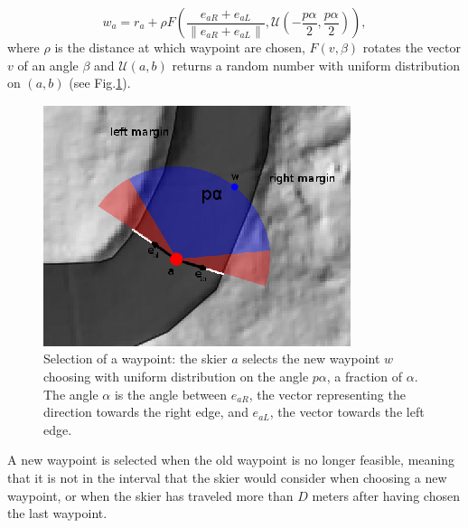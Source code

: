 \documentclass[12pt,a4paper,twoside]{book}
\newcommand{\norm}[1]{\lVert#1\rVert}
\begin{document}
\begin{equation}\label{new_waypoint}
w_a=r_a+\rho F\left(\frac{e_{aR}+e_{aL}}{\norm{e_{aR}+e_{aL}}},\mathcal{U}\left(-\frac{p \alpha}{2},\frac{p \alpha}{2}\right)\right),
\end{equation}
where $\rho$ is the distance at which waypoint are chosen, $F\left(v,\beta\right)$ rotates the vector $v$ of an angle $\beta$ and $\mathcal{U}(a,b)$ returns a random number with uniform distribution on $(a,b)$ (see Fig.\ref{new_waypoint_pic}).

\begin{figure}
  \begin{center}
    \includegraphics[width=\textwidth]{images/waypoint_new.eps}
    \caption{Selection of a waypoint: the skier $a$ selects the new waypoint $w$ choosing with uniform distribution on the angle $p\alpha$, a fraction of $\alpha$. The angle $\alpha$ is the angle between $e_{aR}$, the vector representing the direction towards the right edge, and $e_{aL}$, the vector towards the left edge.}\label{new_waypoint_pic}
  \end{center}
\end{figure}

A new waypoint is selected when the old waypoint is no longer feasible, meaning that it is not in the interval that the skier would consider when choosing a new waypoint, or when the skier has traveled more than $D$ meters after having chosen the last waypoint.
\end{document}
